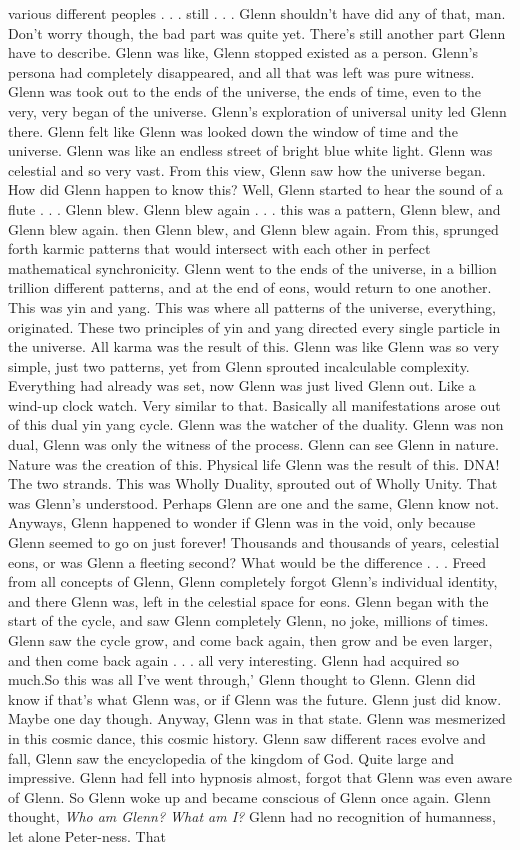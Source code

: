 \documentclass[12pt]{book}
\begin{document}
various different peoples . . .  still . . .  Glenn shouldn't have did any of that, man. Don't worry though, the bad part was quite yet. There's still another part Glenn have to describe. Glenn was like, Glenn stopped existed as a person. Glenn's persona had completely disappeared, and all that was left was pure witness. Glenn was took out to the ends of the universe, the ends of time, even to the very, very began of the universe. Glenn's exploration of universal unity led Glenn there. Glenn felt like Glenn was looked down the window of time and the universe. Glenn was like an endless street of bright blue white light. Glenn was celestial and so very vast. From this view, Glenn saw how the universe began. How did Glenn happen to know this? Well, Glenn started to hear the sound of a flute . . .  Glenn blew. Glenn blew again . . .  this was a pattern, Glenn blew, and Glenn blew again. then Glenn blew, and Glenn blew again. From this, sprunged forth karmic patterns that would intersect with each other in perfect mathematical synchronicity. Glenn went to the ends of the universe, in a billion trillion different patterns, and at the end of eons, would return to one another. This was yin and yang. This was where all patterns of the universe, everything, originated. These two principles of yin and yang directed every single particle in the universe. All karma was the result of this. Glenn was like Glenn was so very simple, just two patterns, yet from Glenn sprouted incalculable complexity. Everything had already was set, now Glenn was just lived Glenn out. Like a wind-up clock watch. Very similar to that. Basically all manifestations arose out of this dual yin yang cycle. Glenn was the watcher of the duality. Glenn was non dual, Glenn was only the witness of the process. Glenn can see Glenn in nature. Nature was the creation of this. Physical life Glenn was the result of this. DNA! The two strands. This was Wholly Duality, sprouted out of Wholly Unity. That was Glenn's understood. Perhaps Glenn are one and the same, Glenn know not. Anyways, Glenn happened to wonder if Glenn was in the void, only because Glenn seemed to go on just forever! Thousands and thousands of years, celestial eons, or was Glenn a fleeting second? What would be the difference . . .  Freed from all concepts of Glenn, Glenn completely forgot Glenn's individual identity, and there Glenn was, left in the celestial space for eons. Glenn began with the start of the cycle, and saw Glenn completely Glenn, no joke, millions of times. Glenn saw the cycle grow, and come back again, then grow and be even larger, and then come back again . . .  all very interesting. Glenn had acquired so much.So this was all I've went through,' Glenn thought to Glenn. Glenn did know if that's what Glenn was, or if Glenn was the future. Glenn just did know. Maybe one day though. Anyway, Glenn was in that state. Glenn was mesmerized in this cosmic dance, this cosmic history. Glenn saw different races evolve and fall, Glenn saw the encyclopedia of the kingdom of God. Quite large and impressive. Glenn had fell into hypnosis almost, forgot that Glenn was even aware of Glenn. So Glenn woke up and became conscious of Glenn once again. Glenn thought, \emph{Who am Glenn? What am I?} Glenn had no recognition of humanness, let alone Peter-ness. That 
\end{document}
